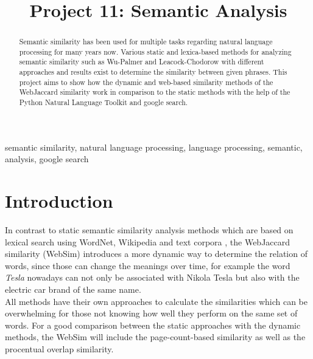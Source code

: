 \documentclass[conference]{IEEEtran}
\begin{document}
\title{Project 11: Semantic Analysis}

\author{
\and
{}
}

\maketitle

\begin{abstract}
Semantic similarity has been used for multiple tasks regarding natural language processing for many years now. Various static and lexica-based methods for analyzing semantic similarity such as Wu-Palmer and Leacock-Chodorow with different approaches and results exist to determine the similarity between given phrases. This project aims to show how the dynamic and web-based similarity methods of the WebJaccard similarity work in comparison to the static methods with the help of the Python Natural Language Toolkit and google search.
\end{abstract}

\begin{IEEEkeywords}
semantic similarity, natural language processing, language processing, semantic, analysis, google search
\end{IEEEkeywords}

\section{Introduction}

In contrast to static semantic similarity analysis methods which are based on lexical search using WordNet, Wikipedia and text corpora \cite{radinsky}, the WebJaccard similarity (WebSim) introduces a more dynamic way to determine the relation of words, since those can change the meanings over time, \cite{websim} for example the word \textit{Tesla} nowadays can not only be associated with Nikola Tesla but also with the electric car brand of the same name. \\All methods have their own approaches to calculate the similarities which can be overwhelming for those not knowing how well they perform on the same set of words. For a good comparison between the static approaches with the dynamic methods, the WebSim will include the page-count-based similarity as well as the procentual overlap similarity.\\
\end{document}
